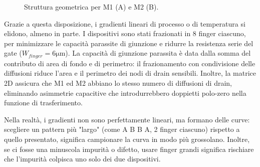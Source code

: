 \documentclass[12pt,a4paper,twoside]{report}
\begin{document}
\vspace{0.5cm}
\begin{figure}[htbp]
    \centering
    \caption{Struttura geometrica per M1 (A) e M2 (B).}
    \label{fig:common_centroid_pattern}
\end{figure}

\vspace{0.3cm}

\noindent Grazie a questa disposizione, i gradienti lineari di processo o di temperatura si elidono, almeno in parte. I dispositivi sono stati frazionati in 8 finger ciascuno, per minimizzare le capacità parassite di giunzione e ridurre la resistenza serie del gate ($W_{finger}=6\mathrm{\mu m}$). La capacità di giunzione parassita è data dalla somma del contributo di area di fondo e di perimetro: il frazionamento con condivisione delle diffusioni riduce l'area e il perimetro dei nodi di drain sensibili. Inoltre, la matrice 2D assicura che M1 ed M2 abbiano lo stesso numero di diffusioni di drain, eliminando asimmetrie capacitive che introdurrebbero doppietti polo-zero nella funzione di trasferimento.

Nella realtà, i gradienti non sono perfettamente lineari, ma formano delle curve: scegliere un pattern più "largo" (come A B B A, 2 finger ciascuno) rispetto a quello presentato, significa campionare la curva in modo più grossolano. Inoltre, se ci fosse una minuscola impurità o difetto, usare finger grandi significa rischiare che l'impurità colpisca uno solo dei due dispositivi.
\end{document}
